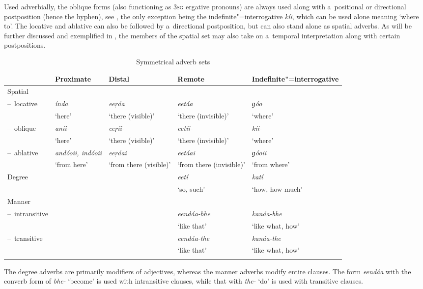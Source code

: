 Used adverbially, the oblique forms (also functioning as \textsc{3sg} ergative pronouns) are always used
along with a~positional or directional postposition (hence the hyphen), see , the only
exception being the indefinite"=interrogative \textit{kíi}, which can be used alone meaning
`where to'. The locative and ablative can also be followed by a~directional postposition, but can
also stand alone as spatial adverbs. As will be further discussed and exemplified in , the
members of the spatial set may also take on a~temporal interpretation along with certain
postpositions.


\begin{table}[ht]
\caption{Symmetrical adverb sets}
\begin{tabularx}{\textwidth}{ l Q Q Q Q }
\lsptoprule
&
Proximate &
Distal &
Remote &
Indefinite"=interrogative\\\hline
Spatial &
&
&
&
\\
--~locative &
\textit{índa} &
\textit{eeṛáa} &
\textit{eetáa} &
\textit{ɡóo} \\
&
`here' &
`there (visible)' &
`there (invisible)' &
`where'\\
--~oblique &
\textit{aníi-} &
\textit{eeṛíi-} &
\textit{eetíi-} &
\textit{kíi-} \\
&
`here' &
`there (visible)' &
`there (invisible)' &
`where'\\
--~ablative &
\textit{andóoii, indóoii} &
\textit{eeṛáai} &
\textit{eetáai} &
\textit{ɡóoii} \\
&
`from here' &
`from there (visible)' &
`from there (invisible)' &
`from where'\\
Degree &
&
&
\textit{eetí} &
\textit{katí} \\
&
&
&
`so, such' &
`how, how much'\\
Manner &
&
&
&
\\
--~intransitive &
&
&
\textit{eendáa-bhe} &
\textit{kanáa-bhe} \\
&
&
&
`like that' &
`like what, how'\\
--~transitive &
&
&
\textit{eendáa-the} &
\textit{kanáa-the} \\
&
&
&
`like that' &
`like what, how'\\\lspbottomrule
\end{tabularx}
\label{tab:7-1}
\end{table}

The degree adverbs are primarily modifiers of adjectives, whereas the manner adverbs modify entire clauses. The form \textit{eendáa} with the converb form of \textit{bhe-} `become' is used with intransitive clauses, while that with \textit{the-} `do' is used with transitive clauses. 

